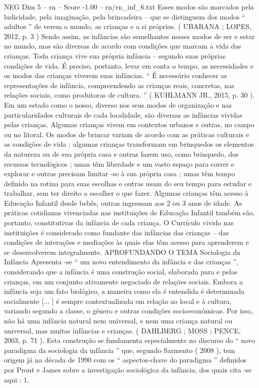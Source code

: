 \begin{textsample}{NEG Dim 5 – rn – Score -1.00 – rn/rn\_inf\_6.txt}
Esses modos são marcados pela ludicidade, pela imaginação, pela brincadeira – que se distinguem dos modos “ adultos ” de verem o mundo, as crianças e a si próprios. ( UBARANA ; LOPES, 2012, p. 3 ) Sendo assim, as infâncias são semelhantes nesses modos de ser e estar no mundo, mas são diversas de acordo com condições que marcam a vida das crianças.
Toda criança vive sua própria infância – segundo suas próprias condições de vida.
É preciso, portanto, levar em conta o tempo, as necessidades e os modos das crianças viverem suas infâncias. “ É necessário conhecer as representações de infância, compreendendo as crianças reais, concretas, nas relações sociais, como produtoras de cultura. ” ( KUHLMANN JR., 2015, p. 30 ).
Em um estado como o nosso, diverso nos seus modos de organização e nas particularidades culturais de cada localidade, são diversas as infâncias vividas pelas crianças.
Algumas crianças vivem em contextos urbanos e outras, no campo ou no litoral.
Os modos de brincar variam de acordo com as práticas culturais e as condições de vida : algumas crianças transformam em brinquedos os elementos da natureza ou de sua própria casa e outras fazem uso, como brinquedo, dos recursos tecnológicos ; umas têm liberdade e um vasto espaço para correr e explorar e outras precisam limitar -se à sua própria casa ; umas têm tempo definido na rotina para suas escolhas e outras usam do seu tempo para estudar e trabalhar, sem ter direito a escolher o que fazer.
Algumas crianças têm acesso à Educação Infantil desde bebês, outras ingressam aos 2 ou 3 anos de idade.
As práticas cotidianas vivenciadas nas instituições de Educação Infantil também são, portanto, constitutivas da infância de cada criança.
O Currículo vivido nas instituições é considerado como fundante das infâncias das crianças – das condições de interações e mediações às quais elas têm acesso para aprenderem e se desenvolverem integralmente.
APROFUNDANDO O TEMA Sociologia da Infância Apresenta -se “ um novo entendimento da infância e das crianças ”, considerando que a infância é uma construção social, elaborada para e pelas crianças, em um conjunto ativamente negociado de relações sociais.
Embora a infância seja um fato biológico, a maneira como ela é entendida é determinada socialmente [... ] é sempre contextualizada em relação ao local e à cultura, variando segundo a classe, o gênero e outras condições socioeconômicas.
Por isso, não há uma infância natural nem universal, e nem uma criança natural ou universal, mas muitas infâncias e crianças. ( DAHLBERG ; MOSS ; PENCE, 2003, p. 71 ).
Esta construção se fundamenta especialmente no discurso do “ novo paradigma da sociologia da infância ” que, segundo Sarmento ( 2008 ), tem origem já na década de 1990 com os “ aspectos-chave do paradigma ” definidos por Prout e James sobre a investigação sociológica da infância, dos quais cita -se aqui : 1.

\end{textsample}
